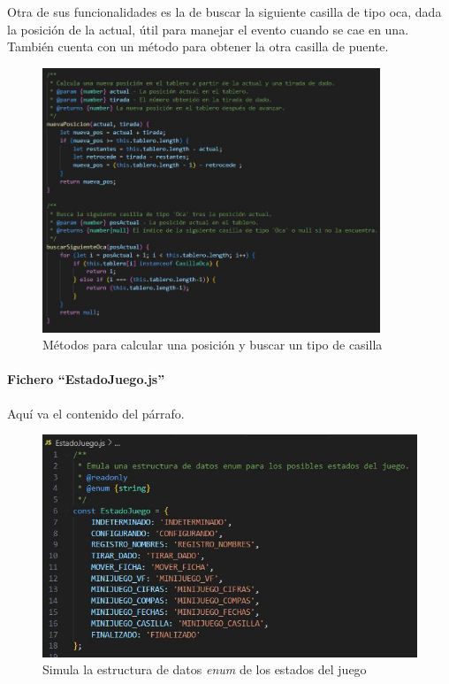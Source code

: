 Otra de sus funcionalidades es la de buscar la siguiente casilla de tipo oca, dada la posición de la actual, útil para manejar el evento cuando se cae en una. También cuenta con un método para obtener la otra casilla de puente.

\begin{figure}[H]
	\centering
	\includegraphics[width=0.9\textwidth]{imgs/codigo-tablero-2.jpg}
	\caption{Métodos para calcular una posición y buscar un tipo de casilla}
	\label{fig:codigo-tablero-2}
\end{figure}

\newpage
\paragraph{Fichero \enquote{EstadoJuego.js}}

Aquí va el contenido del párrafo.

\begin{figure}[H]
	\centering
	\includegraphics{imgs/codigo-estado-1.jpg}
	\caption{Simula la estructura de datos \textit{enum} de los estados del juego}
	\label{fig:codigo-estado-1}
\end{figure}

